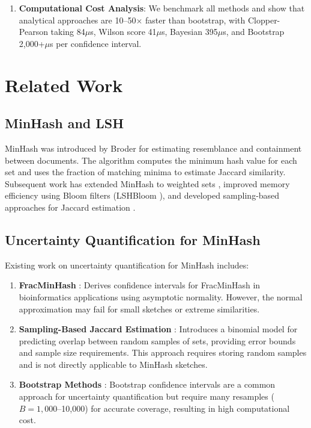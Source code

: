 \documentclass[11pt,letterpaper]{article}
\begin{document}
\begin{enumerate}
    \item \textbf{Computational Cost Analysis}: We benchmark all methods and show that analytical approaches are 10--50$\times$ faster than bootstrap, with Clopper-Pearson taking 84$\mu$s, Wilson score 41$\mu$s, Bayesian 395$\mu$s, and Bootstrap 2,000+$\mu$s per confidence interval.
\end{enumerate}

\section{Related Work}

\subsection{MinHash and LSH}

MinHash was introduced by Broder \cite{Broder1997} for estimating resemblance and containment between documents. The algorithm computes the minimum hash value for each set and uses the fraction of matching minima to estimate Jaccard similarity. Subsequent work has extended MinHash to weighted sets \cite{Wu2018}, improved memory efficiency using Bloom filters (LSHBloom \cite{Khan2024}), and developed sampling-based approaches for Jaccard estimation \cite{Joshi2025}.

\subsection{Uncertainty Quantification for MinHash}

Existing work on uncertainty quantification for MinHash includes:

\begin{enumerate}
    \item \textbf{FracMinHash} \cite{Irber2023}: Derives confidence intervals for FracMinHash in bioinformatics applications using asymptotic normality. However, the normal approximation may fail for small sketches or extreme similarities.
    
    \item \textbf{Sampling-Based Jaccard Estimation} \cite{Joshi2025}: Introduces a binomial model for predicting overlap between random samples of sets, providing error bounds and sample size requirements. This approach requires storing random samples and is not directly applicable to MinHash sketches.
    
    \item \textbf{Bootstrap Methods} \cite{Efron1994}: Bootstrap confidence intervals are a common approach for uncertainty quantification but require many resamples ($B = 1,000$--10,000) for accurate coverage, resulting in high computational cost.
\end{enumerate}
\end{document}
